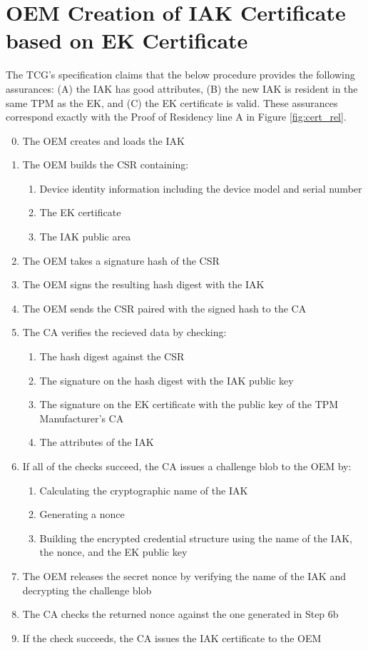 \section{OEM Creation of IAK Certificate based on EK Certificate}
The TCG's specification claims that the below procedure provides the following assurances: (A) the IAK has good attributes, (B) the new IAK is resident in the same TPM as the EK, and (C) the EK certificate is valid. These assurances correspond exactly with the Proof of Residency line A in Figure \ref{fig:cert_rel}.
\begin{enumerate}[itemsep=0pt,parsep=0pt,partopsep=0pt]
  \setcounter{enumi}{-1}
  \item The OEM creates and loads the IAK
  \item The OEM builds the CSR containing:
  \begin{enumerate}[topsep=0pt, itemsep=0pt,parsep=0pt,partopsep=0pt]
    \item Device identity information including the device model and serial
    number
    \item The EK certificate
    \item The IAK public area
  \end{enumerate}
  \item The OEM takes a signature hash of the CSR
  \item The OEM signs the resulting hash digest with the IAK
  \item The OEM sends the CSR paired with the signed hash to the CA
  \item The CA verifies the recieved data by checking:
  \begin{enumerate}[topsep=0pt, itemsep=0pt,parsep=0pt,partopsep=0pt]
    \item The hash digest against the CSR
    \item The signature on the hash digest with the IAK public key
    \item The signature on the EK certificate with the public key of the TPM Manufacturer's CA
    \item The attributes of the IAK
  \end{enumerate}
  \item If all of the checks succeed, the CA issues a challenge blob to the OEM by:
  \begin{enumerate}[topsep=0pt, itemsep=0pt,parsep=0pt,partopsep=0pt]
    \item Calculating the cryptographic name of the IAK
    \item Generating a nonce
    \item Building the encrypted credential structure using the name of the IAK, the nonce, and the EK public key
  \end{enumerate}
  \item The OEM releases the secret nonce by verifying the name of the IAK and decrypting the challenge blob
  \item The CA checks the returned nonce against the one generated in Step 6b
  \item If the check succeeds, the CA issues the IAK certificate to the OEM
\end{enumerate}

